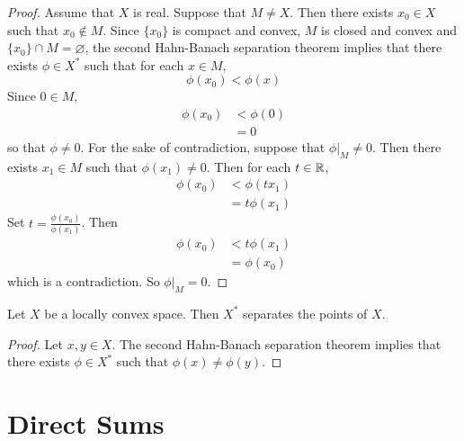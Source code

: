 \documentclass{book}
\begin{document}
	\begin{proof}
		Assume that $X$ is real. Suppose that $M \neq X$. Then there exists $x_0 \in X$ such that $x_0 \not \in M$. Since $\{x_0\}$ is compact and convex, $M$ is closed and convex and $\{x_0\} \cap M = \varnothing$, the second Hahn-Banach separation theorem implies that there exists $\phi \in X^*$ such that for each $x \in M$, $$\phi(x_0) < \phi(x)$$
		Since $0 \in M$, 
		\begin{align*}
			\phi(x_0)
			&< \phi(0) \\
			&= 0
		\end{align*}
	so that $\phi \neq 0$. For the sake of contradiction, suppose that $\phi|_M \neq 0$. Then there exists $x_1 \in M$ such that $\phi(x_1) \neq 0$. Then for each $t \in \mathbb{R}$, 
	\begin{align*}
		\phi(x_0) 
		&< \phi(tx_1) \\
		&= t \phi(x_1)
	\end{align*}
	Set $t = \frac{\phi(x_0)}{\phi(x_1)}$. Then 
	\begin{align*}
		\phi(x_0) 
		&< t \phi(x_1) \\
		&= \phi(x_0)
	\end{align*}
	which is a contradiction. So $\phi|_M = 0$.
	\end{proof}

	\begin{ex}
		Let $X$ be a locally convex space. Then $X^*$ separates the points of $X$. 
	\end{ex}

	\begin{proof}
		Let $x, y \in X$. The second Hahn-Banach separation theorem implies that there exists $\phi \in X^*$ such that $\phi(x) \neq \phi(y)$. 
	\end{proof}









	
	
	
	
	
	
	
	
	
	
	
	
	
	
	
	
	\newpage
	\section{Direct Sums}
\end{document}
